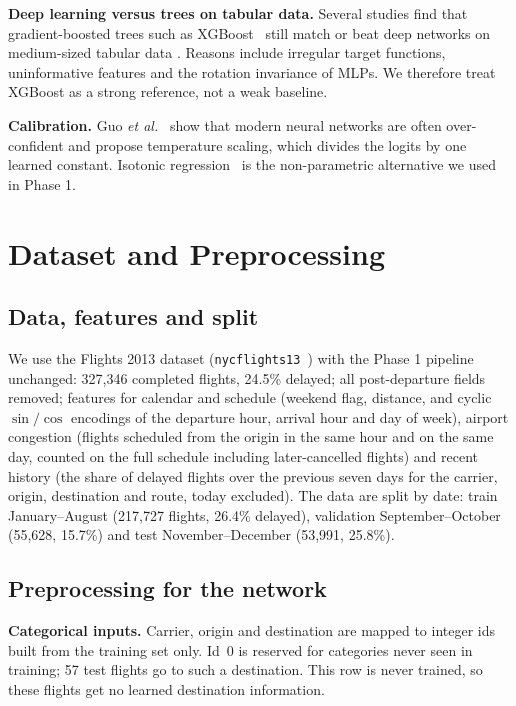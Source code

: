 \documentclass[conference]{IEEEtran}
\begin{document}
\textbf{Deep learning versus trees on tabular data.} Several studies find that gradient-boosted trees such as
XGBoost~\cite{chen2016xgboost} still match or beat deep networks on medium-sized tabular data
\cite{grinsztajn2022tree,shwartz2022tabular}. Reasons include irregular target functions, uninformative features
and the rotation invariance of MLPs. We therefore treat XGBoost as a strong reference, not a weak baseline.

\textbf{Calibration.} Guo \emph{et al.}~\cite{guo2017calibration} show that modern neural networks are often
over-confident and propose temperature scaling, which divides the logits by one learned constant. Isotonic
regression~\cite{zadrozny2002transforming} is the non-parametric alternative we used in Phase 1.

\section{Dataset and Preprocessing}
\subsection{Data, features and split}
We use the Flights 2013 dataset (\texttt{nycflights13}~\cite{nycflights13}) with the Phase 1 pipeline unchanged:
327{,}346 completed flights, 24.5\% delayed; all post-departure fields removed; features for calendar and schedule
(weekend flag, distance, and cyclic $\sin/\cos$ encodings of the departure hour, arrival hour and day of week),
airport congestion (flights scheduled from the origin in the same hour and on the same day, counted on the full
schedule including later-cancelled flights) and recent history (the share of delayed flights over the previous
seven days for the carrier, origin, destination and route, today excluded). The data are split by date: train
January--August (217{,}727 flights, 26.4\% delayed), validation September--October (55{,}628, 15.7\%) and test
November--December (53{,}991, 25.8\%).

\subsection{Preprocessing for the network}
\textbf{Categorical inputs.} Carrier, origin and destination are mapped to integer ids built from the training set
only. Id~0 is reserved for categories never seen in training; 57 test flights go to such a destination. This
row is never trained, so these flights get no learned destination information.
\end{document}
